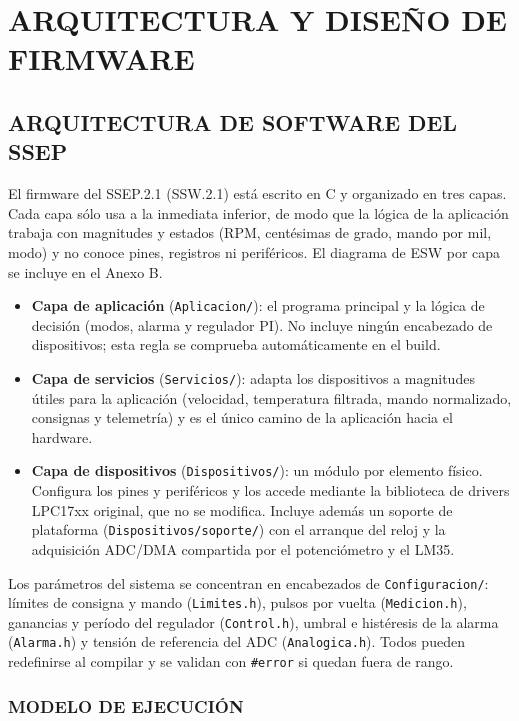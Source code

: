 \section{ARQUITECTURA Y DISEÑO DE FIRMWARE}

\subsection{ARQUITECTURA DE SOFTWARE DEL SSEP}

El firmware del SSEP.2.1 (SSW.2.1) está escrito en C y organizado en tres capas. Cada
capa sólo usa a la inmediata inferior, de modo que la lógica de la aplicación trabaja con
magnitudes y estados (RPM, centésimas de grado, mando por mil, modo) y no conoce pines,
registros ni periféricos. El diagrama de ESW por capa se incluye en el Anexo B.

\begin{itemize}
  \item \textbf{Capa de aplicación} (\texttt{Aplicacion/}): el programa principal y la
  lógica de decisión (modos, alarma y regulador PI). No incluye ningún encabezado de
  dispositivos; esta regla se comprueba automáticamente en el build.
  \item \textbf{Capa de servicios} (\texttt{Servicios/}): adapta los dispositivos a
  magnitudes útiles para la aplicación (velocidad, temperatura filtrada, mando
  normalizado, consignas y telemetría) y es el único camino de la aplicación hacia el
  hardware.
  \item \textbf{Capa de dispositivos} (\texttt{Dispositivos/}): un módulo por elemento
  físico. Configura los pines y periféricos y los accede mediante la biblioteca de drivers
  LPC17xx original, que no se modifica. Incluye además un soporte de plataforma
  (\texttt{Dispositivos/soporte/}) con el arranque del reloj y la adquisición ADC/DMA
  compartida por el potenciómetro y el LM35.
\end{itemize}

Los parámetros del sistema se concentran en encabezados de \texttt{Configuracion/}:
límites de consigna y mando (\texttt{Limites.h}), pulsos por vuelta
(\texttt{Medicion.h}), ganancias y período del regulador (\texttt{Control.h}), umbral e
histéresis de la alarma (\texttt{Alarma.h}) y tensión de referencia del ADC
(\texttt{Analogica.h}). Todos pueden redefinirse al compilar y se validan con
\texttt{\#error} si quedan fuera de rango.

\subsubsection{MODELO DE EJECUCIÓN}

